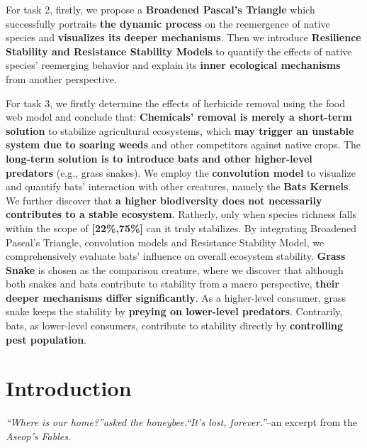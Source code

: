 \documentclass[12pt]{article}
\begin{document}
For task 2, firstly, we propose a \textbf{Broadened Pascal's Triangle }which successfully portraits \textbf{the dynamic process} on the reemergence of native species and \textbf{visualizes its deeper mechanisms}. Then we introduce \textbf{Resilience Stability and Resistance Stability Models} to quantify the effects of native species' reemerging behavior and explain its \textbf{inner ecological mechanisms} from another perspective.

For task 3, we firstly determine the effects of herbicide removal using the food web model and conclude that: \textbf{Chemicals' removal is merely a short-term solution} to stabilize agricultural ecosystems, which \textbf{may trigger an unstable system due to soaring weeds} and other competitors against native crops. The \textbf{long-term solution is to introduce bats and other higher-level predators} (e.g., grass snakes). We employ the \textbf{convolution model} to visualize and quantify bats' interaction with other creatures, namely the \textbf{Bats Kernels}. We further discover that \textbf{a higher biodiversity does not necessarily contributes to a stable ecosystem}. Ratherly, only when species richness falls within the scope of \textbf{[22\%,75\%]} can it truly stabilizes. By integrating Broadened Pascal's Triangle, convolution models and Resistance Stability Model, we comprehensively evaluate bats' influence on overall ecosystem stability. \textbf{Grass Snake} is chosen as the comparison creature, where we discover that although both snakes and bats contribute to stability from a macro perspective, \textbf{their deeper mechanisms differ significantly}. As a higher-level consumer, grass snake keeps the stability by \textbf{preying on lower-level predators}. Contrarily, bats, as lower-level consumers, contribute to stability directly by \textbf{controlling pest population}.  
	
	
	
	
	
	
	\clearpage
	\pagestyle{fancy}
	\tableofcontents 
	\newpage
	\section{Introduction}
\hspace{1.5em}\textit{``Where is our home?''asked the honeybee.``It's lost, forever.''}--an excerpt from the \textit{Aseop's Fables}.
\end{document}
